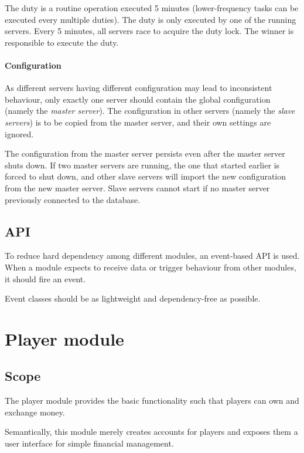 \documentclass{report}
\begin{document}
					The duty is a routine operation executed 5 minutes (lower-frequency tasks can be executed every multiple duties).
					The duty is only executed by one of the running servers.
					Every 5 minutes, all servers race to acquire the duty lock.
					The winner is responsible to execute the duty.

				\subsection{Configuration}

					As different servers having different configuration may lead to inconsistent behaviour,
					only exactly one server should contain the global configuration (namely the \emph{master server}).
					The configuration in other servers (namely the \emph{slave servers}) is to be copied from the master server,
					and their own settings are ignored.

					The configuration from the master server persists even after the master server shuts down.
					If two master servers are running, the one that started earlier is forced to shut down,
					and other slave servers will import the new configuration from the new master server.
					Slave servers cannot start if no master server previously connected to the database.

		\chapter{API}

			To reduce hard dependency among different modules, an event-based API is used.
			When a module expects to receive data or trigger behaviour from other modules,
			it should fire an event.

			Event classes should be as lightweight and dependency-free as possible.

	\part{Player module}
		\chapter{Scope}

			The player module provides the basic functionality such that players can own and exchange money.

			Semantically, this module merely creates accounts for players and exposes them a user interface for simple financial management.
\end{document}
